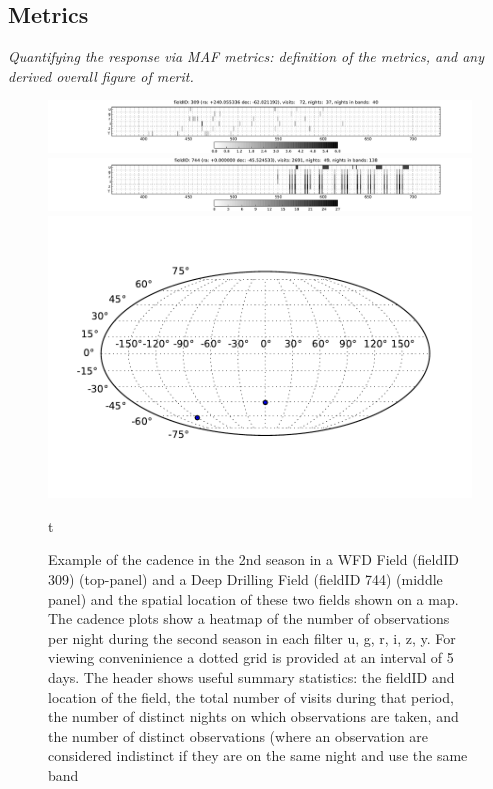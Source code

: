 






\subsection{Metrics}
\label{sec:keyword:metrics}

{\it Quantifying the response via MAF metrics: definition of the metrics,
and any derived overall figure of merit.}
\label{sec:keyword:metrics}
\begin{figure}
 \centering
 \includegraphics[width=\textwidth]{figs/supernova/fig_309_2ndYear}
 \includegraphics[width=\textwidth]{figs/supernova/fig_744_2ndYear}
 \includegraphics[height=0.2\textheight]{figs/supernova/loc_309_744.pdf}
 \label{fig:SN_sampling}
 \caption{Example of the cadence in the 2nd season in a WFD Field (fieldID 309) (top-panel) and a Deep Drilling Field (fieldID 744) (middle panel) and the
     spatial location of these two fields shown on a map. The cadence plots show a heatmap of the number of observations per night during the second season in each filter u, g, r, i, z, y. For viewing conveninience a dotted grid is provided at an interval of 5 days. The header shows useful summary statistics:
 the fieldID and location of the field, the total number of visits during that period, the number of distinct nights on which observations are taken, and the number of distinct observations (where an observation are considered indistinct if they are on the same night and use the same band}
t
\end{figure}

